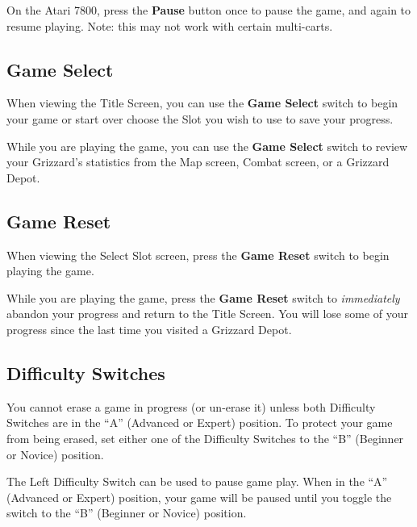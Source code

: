 \documentclass[10pt,twocolumn,openany,article]{memoir}
\begin{document}
On the  Atari 7800, press  the \textbf{Pause}  button once to  pause the
game, and  again to  resume playing.  \ifdefined\ATARIAGESAVE\else Note:
this may not work with certain multi-carts. \fi

\fi

\subsection{Game Select}

When  viewing the  Title Screen,  you can  use the  \textbf{Game Select}
switch to
\ifdefined\NOSAVE
begin your game or start over
\else
choose the Slot you wish to use to save your progress.
\fi

While you  are playing the  game, you  can use the  \textbf{Game Select}
switch to review your Grizzard's  statistics from the Map screen, Combat
screen, or a Grizzard Depot.

\subsection{Game Reset}

When  viewing the  Select  Slot screen,  press  the \textbf{Game  Reset}
switch to begin playing the game.

While you are playing the game,  press the \textbf{Game Reset} switch to
\emph{immediately} abandon your progress and return to the Title Screen.
You will  lose some  of your  progress since the  last time  you visited
a Grizzard Depot.

\subsection{Difficulty Switches}

\ifdefined\NOSAVE\else

You  cannot erase  a  game  in progress  (or  un-erase  it) unless  both
Difficulty  Switches are  in the  ``A'' (Advanced  or Expert)  position.
To protect your game from being erased, set either one of the Difficulty
Switches to the ``B'' (Beginner or Novice) position.

\fi

\ifdefined\TVSECAM

The Left Difficulty Switch  can be used to pause game  play. When in the
``A'' (Advanced or Expert) position, your  game will be paused until you
toggle the switch to the ``B'' (Beginner or Novice) position.

\else
\end{document}
